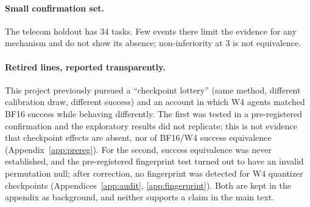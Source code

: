 \paragraph{Small confirmation set.} The telecom holdout has 34 tasks. Few events there limit the evidence for any mechanism and do not show its absence; non-inferiority at 3\pp{} is not equivalence.

\paragraph{Retired lines, reported transparently.} This project previously pursued a ``checkpoint lottery'' (same method, different calibration draw, different success) and an account in which W4 agents matched BF16 success while behaving differently. The first was tested in a pre-registered confirmation and the exploratory results did not replicate; this is not evidence that checkpoint effects are absent, nor of BF16/W4 success equivalence (Appendix~\ref{app:prereg}). For the second, success equivalence was never established, and the pre-registered fingerprint test turned out to have an invalid permutation null; after correction, no fingerprint was detected for W4 quantizer checkpoints (Appendices~\ref{app:audit}, \ref{app:fingerprint}). Both are kept in the appendix as background, and neither supports a claim in the main text.
